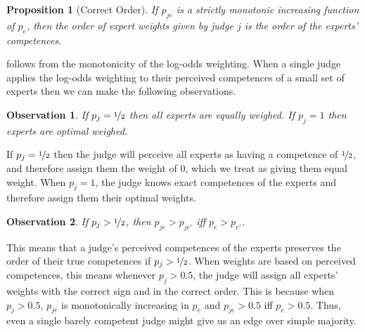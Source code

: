 \documentclass[letterpaper]{article} %
\newtheorem{proposition}{Proposition}
\newtheorem{observation}{Observation}
\newcommand{\judge}{\ensuremath{j} }
\newcommand{\expert}{\ensuremath{e} }
\begin{document}
\begin{proposition}[Correct Order]\label{prop:single_j_correct_order}
 If $p_{\judge \expert}$ is a strictly monotonic increasing function of $p_\expert$, then the order of expert weights given by judge $j$ is the order of the experts' competences.
\end{proposition}

 follows from the monotonicity of the log-odds weighting. When a single judge applies the log-odds weighting to their perceived competences of a small set of experts then we can make the following observations.

\begin{observation}\label{observation:extremes}
 If $p_\judge = \nicefrac{1}{2}$ then all experts are equally weighed. %
 If $p_\judge = 1$ then experts are optimal weighed.
 \end{observation}

If $p_\judge = \nicefrac{1}{2}$ then the judge will perceive all experts as having a competence of $\nicefrac{1}{2}$, and therefore assign them the weight of 0, which we treat as giving them equal weight. %
When $p_\judge = 1$, the judge knows exact competences of the experts and therefore assign them their optimal weights.

\begin{observation}\label{observation:monotonic}
 If $p_\judge > \nicefrac{1}{2}$, then $p_{\judge \expert} > p_{\judge \expert'}$ iff $p_\expert > p_{\expert'}$.
\end{observation}

This means that a judge's perceived competences of the experts preserves the order of their true competences if $p_j > \nicefrac{1}{2}$.
%
When weights are based on perceived competences, this means whenever $p_\judge > 0.5$, the judge will assign all experts' weights with the correct sign and in the correct order. This is because when $p_\judge > 0.5$, $p_{\judge \expert}$ is monotonically increasing in $p_\expert$ and $p_{\judge \expert} > 0.5$ iff $p_\expert > 0.5$. Thus, even a single barely competent judge might give us an edge over simple majority.
\end{document}
